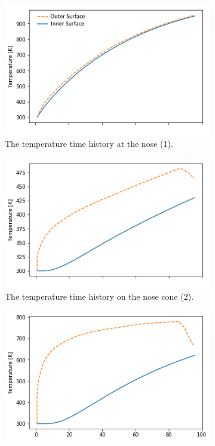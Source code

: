 \begin{figure}[ht]
	\begin{subfigure}{.495\textwidth}
		\centering
		\includegraphics[width=0.99\linewidth]{figures/A1_uncertainty-analysis/TNose3}
		\caption{The temperature time history at the nose (\textcolor{black}{1}).}
	\end{subfigure}
	\begin{subfigure}{.495\textwidth}
		\centering
		\includegraphics[width=0.99\linewidth]{figures/A1_uncertainty-analysis/T3onNose}
		\caption{The temperature time history on the nose cone (\textcolor{black}{2}).}
	\end{subfigure}
	\begin{subfigure}{.495\textwidth}
		\centering
		\includegraphics[width=0.99\linewidth]{figures/A1_uncertainty-analysis/T3Body}

\end{subfigure}
\end{figure}

